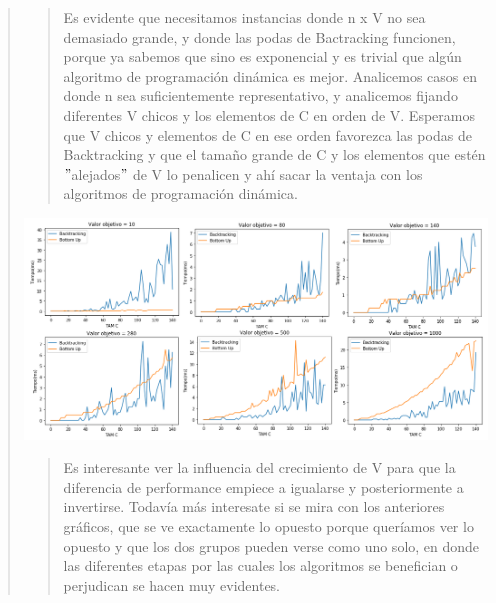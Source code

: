 \documentclass[8pt,a4paper]{article}
\begin{document}
\begin{verse}
\begin{verse}
Es evidente que necesitamos instancias donde n x V no sea demasiado grande, y donde las podas de Bactracking funcionen, porque ya sabemos que sino es exponencial y es trivial que algún algoritmo de programación dinámica es mejor. Analicemos casos en donde n sea suficientemente representativo, y analicemos fijando diferentes V chicos y los elementos de C en orden de V. Esperamos que V chicos y elementos de C en ese orden favorezca las podas de Backtracking y que el tamaño grande de C y los elementos que estén $"$alejados$"$ de V lo penalicen y ahí sacar la ventaja con los algoritmos de programación dinámica.
\end{verse}
\includegraphics[scale=.6]{backvspd.png}
\begin{verse}
Es interesante ver la influencia del crecimiento de V para que la diferencia de performance empiece a igualarse y posteriormente a invertirse. Todavía más interesate si se mira con los anteriores gráficos, que se ve exactamente lo opuesto porque queríamos ver lo opuesto y que los dos grupos pueden verse como uno solo, en donde las diferentes etapas por las cuales los algoritmos se benefician o perjudican se hacen muy evidentes.\\
\end{verse}



\end{verse}
\end{document}
